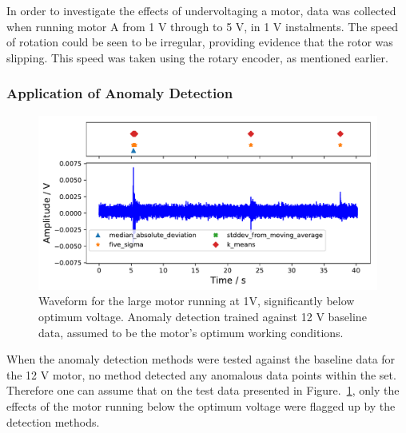 
In order to investigate the effects of undervoltaging a motor, data was collected when running motor A from 1 V through to 5 V, in 1 V instalments. The speed of rotation could be seen to be irregular, providing evidence that the rotor was slipping. This speed was taken using the rotary encoder, as mentioned earlier. %


\subsubsection{Application of Anomaly Detection}


\begin{figure}[t]
    \includegraphics[width=1.0\textwidth]{fig/large_1V_nowater_large_12V.pdf}
    \caption[Undervoltage of Large Motor]{Waveform for the large motor running at 1V, significantly below optimum voltage. Anomaly detection trained against 12 V baseline data, assumed to be the motor's optimum working conditions.}
    \label{fig:largemotor_1V}
\end{figure}

When the anomaly detection methods were tested against the baseline data for the 12 V motor, no method detected any anomalous data points within the set. Therefore one can assume that on the test data presented in Figure.~\ref{fig:largemotor_1V}, only the effects of the motor running below the optimum voltage were flagged up by the detection methods. 

